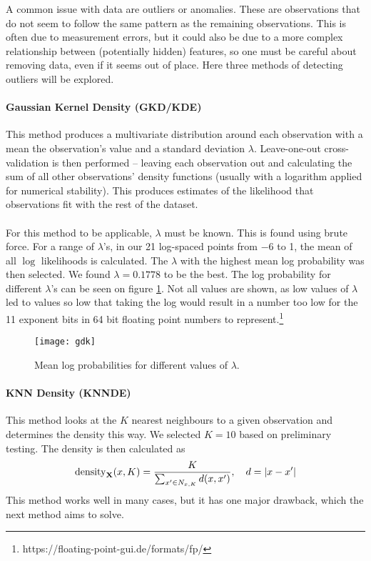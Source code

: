 A common issue with data are outliers or anomalies.
These are observations that do not seem to follow the same pattern as the remaining observations.
This is often due to measurement errors, but it could also be due to a more complex relationship between (potentially hidden) features, so one must be careful about removing data, even if it seems out of place.
Here three methods of detecting outliers will be explored.

\paragraph{Gaussian Kernel Density (GKD/KDE)}
This method produces a multivariate distribution around each observation with a mean the observation's value and a standard deviation $ \lambda $.
Leave-one-out cross-validation is then performed -- leaving each observation out and calculating the sum of all other observations' density functions (usually with a logarithm applied for numerical stability).
This produces estimates of the likelihood that observations fit with the rest of the dataset.\\
\\
For this method to be applicable, $ \lambda $ must be known.
This is found using brute force.
For a range of $ \lambda $'s, in our 21 log-spaced points from $ -6 $ to 1, the mean of all $ \log $ likelihoods is calculated.
The $ \lambda $ with the highest mean log probability was then selected.
We found $ \lambda=0.1778 $ to be the best.
The log probability for different $ \lambda $'s can be seen on figure \ref{fig:lambdas}.
Not all values are shown, as low values of $ \lambda $ led to values so low that taking the log would result in a number too low for the 11 exponent bits in 64 bit floating point numbers to represent.\footnote{https://floating-point-gui.de/formats/fp/}
\begin{figure}[H]
	\centering
	\texttt{[image: gdk]}
	\caption{Mean log probabilities for different values of $ \lambda $.}
	\label{fig:lambdas}
\end{figure}\noindent

\paragraph{KNN Density (KNNDE)}
This method looks at the $ K $ nearest neighbours to a given observation and determines the density this way. We selected $ K=10 $ based on preliminary testing.
The density is then calculated as
\begin{equation*}
	\operatorname{density}_{\mathbf X}(x, K)=\frac{K}{\sum_{x'\in N_{x, K}}d(x, x')}, \quad d=\left\lvert x-x'\right\rvert
\end{equation*}
This method works well in many cases, but it has one major drawback, which the next method aims to solve.

